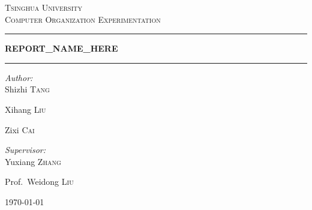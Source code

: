\documentclass{article}
\begin{document}
\begin{titlepage}
\fancyhead[CH]{}

\hspace{3.0cm}
\begin{center}
\vfill

\textsc{\LARGE Tsinghua University}\\[1.5cm]

\textsc{\Large Computer Organization Experimentation}\\[0.5cm]


\rule[0.75\baselineskip]{0.75\textwidth}{1pt}

{ \huge \bfseries REPORT\_NAME\_HERE}\\[0.4cm]

\rule[20\baselineskip]{0.75\textwidth}{1pt}

\begin{minipage}{0.4\textwidth}
\begin{flushleft} \large
\emph{Author:}\\
Shizhi \textsc{Tang}

Xihang \textsc{Liu}

Zixi \textsc{Cai}
\end{flushleft}
\end{minipage}
\begin{minipage}{0.4\textwidth}
\begin{flushright} \large
\emph{Supervisor:} \\
Yuxiang \textsc{Zhang}

Prof.~Weidong \textsc{Liu}
\end{flushright}
\end{minipage}

\vfill
\vspace{3.0cm}
{\large \today}

\end{center}

\end{titlepage}
\setcounter{page}{2}
\tableofcontents
\newpage
\end{document}
